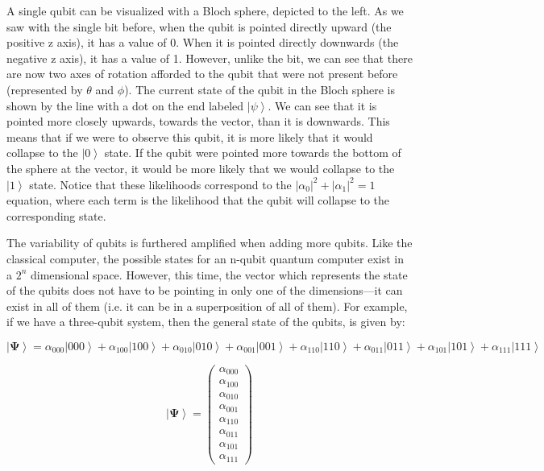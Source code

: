 \documentclass[11pt]{article}
\begin{document}
\begin{figure}
    \begin{center}
    \def\svgwidth{2in}
    
    \end{center}
\end{figure}

A single qubit can be visualized with a Bloch sphere, depicted to the left. As we saw with the single bit before, when the qubit is pointed directly upward (the positive z axis), it has a value of 0. When it is pointed directly downwards (the negative z axis), it has a value of 1. However, unlike the bit, we can see that there are now two axes of rotation afforded to the qubit that were not present before (represented by $\theta$ and $\phi$). The current state of the qubit in the Bloch sphere is shown by the line with a dot on the end labeled $\left | \psi \right \rangle$. We can see that it is pointed more closely upwards, towards the  vector, than it is downwards. This means that if we were to observe this qubit, it is more likely that it would collapse to the $\left | 0 \right \rangle$ state. If the qubit were pointed more towards the bottom of the sphere at the  vector, it would be more likely that we would collapse to the $\left | 1 \right \rangle$ state. Notice that these likelihoods correspond to the $ \left | \alpha_{0} \right |^{2} + \left | \alpha_{1} \right |^{2}=1$ equation, where each term is the likelihood that the qubit will collapse to the corresponding state.

The variability of qubits is furthered amplified when adding more qubits. Like the classical computer, the possible states for an n-qubit quantum computer exist in a $2^{n}$ dimensional space. However, this time, the vector which represents the state of the qubits does not have to be pointing in only one of the dimensions—it can exist in all of them (i.e. it can be in a superposition of all of them). For example, if we have a three-qubit system, then the general state of the qubits, is given by:

$$ \left | \mathbf{\Psi} \right \rangle=\alpha _{000}\left | 000 \right \rangle+\alpha _{100}\left | 100 \right \rangle+\alpha _{010}\left | 010 \right \rangle+\alpha _{001}\left | 001 \right 
                \rangle+\alpha _{110}\left | 110 \right \rangle+\alpha _{011}\left | 011 \right \rangle+\alpha _{101}\left | 101 \right \rangle+\alpha _{111}\left | 111 
                \right \rangle$$
                
$$\left | \mathbf{\Psi} \right \rangle=\begin{pmatrix}\alpha_{000}\\\alpha _{100}\\\alpha_{010}\\\alpha_{001}\\\alpha_{110}\\\alpha_{011}\\\alpha_{101}\\\alpha_{111}\end{pmatrix}$$
\end{document}
